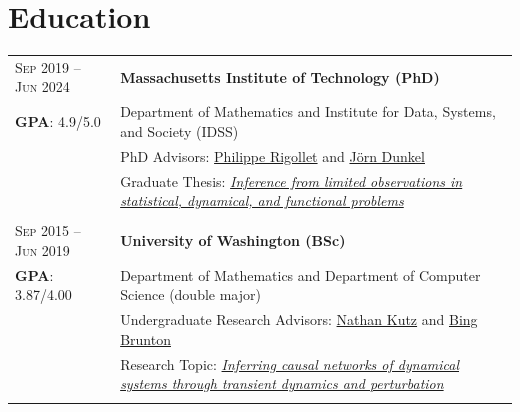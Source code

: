 \documentclass[a4paper,10pt]{article}
\begin{document}
\section{Education}
\begin{tabular}{lp{13cm}}
\textsc{Sep} 2019 -- \textsc{Jun} 2024 & \textbf{Massachusetts Institute of Technology (PhD)}\\
\textsc{\bf GPA}: 4.9/5.0 & Department of Mathematics and Institute for Data, Systems, and Society (IDSS)\\
& PhD Advisors: \href{\detokenize{https://math.mit.edu/~rigollet/}}{Philippe Rigollet} and \href{\detokenize{https://math.mit.edu/~dunkel/}}{Jörn Dunkel}\\
& Graduate Thesis: \textit{\href{\detokenize{https://dspace.mit.edu/handle/1721.1/155887}}{Inference from limited observations in statistical, dynamical, and functional problems}}\\
\\
\textsc{Sep} 2015 -- \textsc{Jun} 2019 & \textbf{University of Washington (BSc)}\\
\textsc{\bf GPA}: 3.87/4.00 & Department of Mathematics and Department of Computer Science (double major)\\
& Undergraduate Research Advisors: \href{\detokenize{http://faculty.washington.edu/kutz/}}{Nathan Kutz} and \href{\detokenize{https://www.bingbrunton.com/}}{Bing Brunton}\\
& Research Topic: \textit{\href{\detokenize{https://journals.aps.org/pre/abstract/10.1103/PhysRevE.102.042309}}{Inferring causal networks of dynamical systems through transient dynamics and perturbation}}\\
\\
\end{tabular}\\
\end{document}

